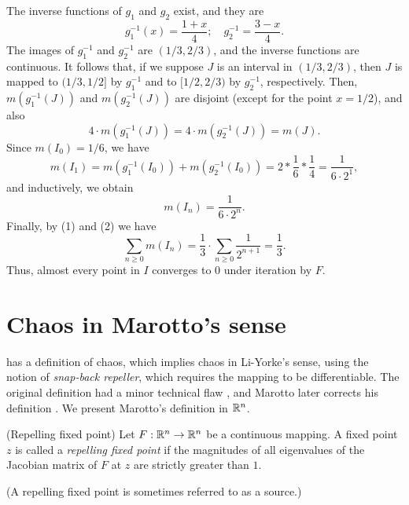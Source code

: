 \documentclass[10pt,draft,twoside]{book}
\begin{document}
\begin{example}
The inverse functions of $g_1$ and $g_2$ exist, and they are
\begin{equation*}
  g_1^{-1}(x) = \frac{1+x}{4}; \quad g_2^{-1} = \frac{3-x}{4}.
\end{equation*}
The images of $g_1^{-1}$ and $g_2^{-1}$ are $(1/3,2/3)$, and the inverse functions are continuous.
It follows that, if we suppose $J$ is an interval in $(1/3,2/3)$, then $J$ is mapped to $(1/3,1/2]$ by $g_1^{-1}$ and to $[1/2,2/3)$ by $g_2^{-1}$, respectively.
Then, $m(g_1^{-1}(J))$ and $m(g_2^{-1}(J))$ are disjoint (except for the point $x = 1/2$), and also
\begin{equation*}
  4 \cdot m(g_1^{-1}(J)) = 4 \cdot m(g_2^{-1}(J)) = m(J).
\end{equation*}
Since $m(I_0) = 1/6$, we have
\begin{equation*}
  m(I_1) 
  = m(g_1^{-1}(I_0)) + m(g_2^{-1}(I_0))
  = 2 * \frac{1}{6} * \frac{1}{4}
  = \frac{1}{6\cdot 2^1},
\end{equation*}
and inductively, we obtain
\begin{equation*}
  m(I_n) = \frac{1}{6 \cdot 2^n}.
\end{equation*}
%
Finally, by (1) and (2) we have
\begin{equation*}
  \sum\limits_{n\geq 0} m(I_n)
  = \frac{1}{3} \cdot \sum\limits_{n\geq 0} \frac{1}{2^{n+1}}
  = \frac{1}{3}.
\end{equation*}
Thus, almost every point in $I$ converges to 0 under iteration by $F$.
\end{example}


\section{Chaos in Marotto's sense}
\citet{marotto1} has a definition of chaos, which implies chaos in Li-Yorke's sense, using the notion of \textit{snap-back repeller}, which requires the mapping to be differentiable.
The original definition had a minor technical flaw \citep{shi}, and Marotto later corrects his definition \citep{marotto2}.
We present Marotto's definition in $\mathbb{R}^n$.
\begin{definition}
  (Repelling fixed point)
  Let $F: \mathbb{R}^n \to \mathbb{R}^n$ be a continuous mapping. 
  A fixed point $z$ is called a \textit{repelling fixed point} if the magnitudes of all eigenvalues of the Jacobian matrix of $F$ at $z$ are strictly greater than $1$.
\end{definition}
(A repelling fixed point is sometimes referred to as a source.)
\end{document}
